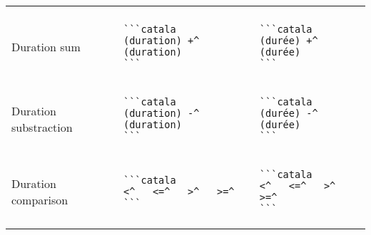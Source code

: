 \documentclass[a3paper,landscape]{article}
\begin{document}
\begin{multicols*}{2}
\begin{center}
\begin{tabular}{p{}p{}p{}}
\vspace*{-1.75em}
\\
Duration sum&
\vspace*{-1.75em}
\begin{verbatim}
```catala
(duration) +^ (duration)
```
\end{verbatim}
\vspace*{-1.75em}
&
\vspace*{-1.75em}
\begin{verbatim}
```catala
(durée) +^ (durée)
```
\end{verbatim}
\vspace*{-1.75em}
\\
Duration substraction&
\vspace*{-1.75em}
\begin{verbatim}
```catala
(duration) -^ (duration)
```
\end{verbatim}
\vspace*{-1.75em}
&
\vspace*{-1.75em}
\begin{verbatim}
```catala
(durée) -^ (durée)
```
\end{verbatim}
\vspace*{-1.75em}
\\
Duration comparison&
\vspace*{-1.75em}
\begin{verbatim}
```catala
<^   <=^   >^   >=^
```
\end{verbatim}
\vspace*{-1.75em}
&
\vspace*{-1.75em}
\begin{verbatim}
```catala
<^   <=^   >^   >=^
```
\end{verbatim}
\vspace*{-1.75em}
\\
\bottomrule
\end{tabular}
\end{center}



\end{multicols*}
\end{document}
